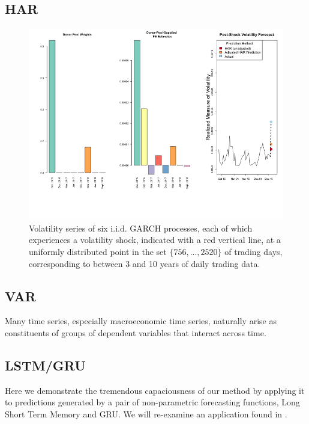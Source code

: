\documentclass[11pt]{article}
\theoremstyle{definition}
\begin{document}
\subsection{HAR}
\begin{figure}[h!]
  \begin{center}
    \includegraphics[scale=.4]{real_data_output_plots/savetime_SatJun151644072024__^VIX-^IRX-^XAU_^VIX_2018-12-18-2015-12-15-2016-12-13-2017-03-14-2017-06-13-2017-12-12-2018-03-20-2018-06-12-2018-09-25.png}
    \caption{Volatility series of six i.i.d. GARCH processes, each of which experiences a volatility shock, indicated with a red vertical line, at a uniformly distributed point in the set $\{756,...,2520\}$ of trading days, corresponding to between 3 and 10 years of daily trading data.}
    \label{fig:six_plots}
    \end{center}
  \end{figure}

\subsection{VAR}
Many time series, especially macroeconomic time series, naturally arise as constituents of groups of dependent variables that interact across time.
\subsection{LSTM/GRU}

Here we demonstrate the tremendous capaciousness of our method by applying it to predictions generated by a pair of non-parametric forecasting functions, Long Short Term Memory and GRU.  We will re-examine an application found in \cite{lin2021minimizing}.
\end{document}
